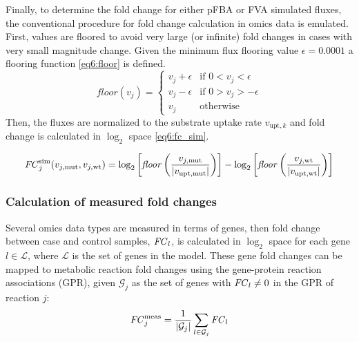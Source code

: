 Finally, to determine the fold change for either pFBA or FVA simulated fluxes, the conventional procedure for fold change calculation in omics data is emulated. First, values are floored to avoid very large (or infinite) fold changes in cases with very small magnitude change. Given the minimum flux flooring value $\epsilon=0.0001$ a flooring function \eqref{eq6:floor} is defined.
\begin{equation} \label{eq6:floor}
    \mathit{floor}(v_j) = \begin{cases}
        v_j + \epsilon &\text{if } 0 < v_j < \epsilon \\
        v_j - \epsilon &\text{if } 0 > v_j > -\epsilon \\
        v_j     &\text{otherwise }
    \end{cases}
\end{equation}
Then, the fluxes are normalized to the substrate uptake rate $v_{\text{upt},k}$ and fold change is calculated in $\log_2$ space \eqref{eq6:fc_sim}.

\begin{equation} \label{eq6:fc_sim}
    \mathit{FC}_j^{\mathrm{sim}} (v_{j,\text{mut}}, v_{j,\text{wt}}) = \log_2 \left[ \mathit{floor}\left( \frac{v_{j,\text{mut}}}{|v_{\text{upt,mut}}|} \right) \right] -
    \log_2 \left[ \mathit{floor}\left( \frac{v_{j,\text{wt}}}{|v_{\text{upt,wt}}|} \right) \right]
\end{equation}

\subsubsection{Calculation of measured fold changes}
Several omics data types are measured in terms of genes, then fold change between case and control samples, $\mathit{FC}_l$, is calculated in $\log_2$ space for each gene $l\in \mathcal{L}$, where $\mathcal{L}$ is the set of genes in the model. These gene fold changes can be mapped to metabolic reaction fold changes using the gene-protein reaction associations (GPR), given $\mathcal{G}_j$ as the set of genes with $\mathit{FC}_l \ne 0$ in the GPR of reaction $j$:
\begin{equation}
    \mathit{FC}_j^{\mathrm{meas}} = \frac{1}{|\mathcal{G}_j|}\sum_{l \in \mathcal{G}_j} \mathit{FC}_l \label{eq6:fc_meas}
\end{equation}

